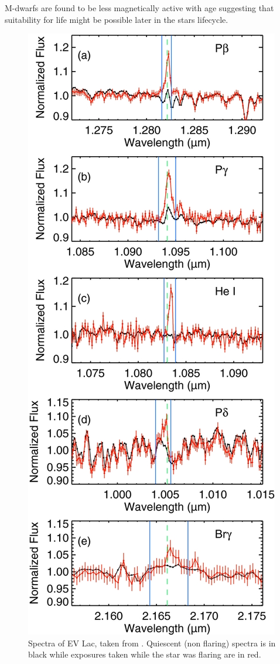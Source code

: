 M-dwarfs are found to be less magnetically active with age \citep{2008West} suggesting that suitability for life might be possible later in the stars lifecycle.\\

\begin{figure}
    \centering
    \includegraphics[width=\textwidth,height=0.95\textheight,keepaspectratio]{Flare.jpg}
    \caption{Spectra of EV Lac, taken from \citet{2012Schmidt}. Quiescent (non flaring) spectra is in black while exposures taken while the star was flaring are in red.}
    \label{figFlare}
\end{figure}
